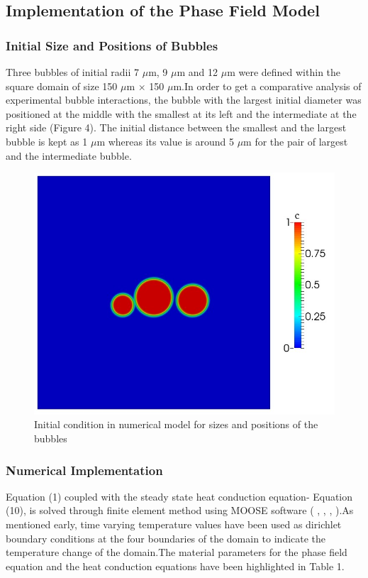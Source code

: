 \documentclass[10pt,a4paper]{article}
\begin{document}
\subsection{Implementation of the Phase Field Model}
\subsubsection{Initial Size and Positions of Bubbles}
Three bubbles of initial radii 7 $\mu$m, 9 $\mu$m and 12 $\mu$m were defined within the square domain of size 150 $\mu$m $\times$ 150 $\mu$m.In order to get a comparative analysis of experimental bubble interactions, the bubble with the largest initial diameter was positioned at the middle with the smallest at its left and the intermediate at the right side (Figure 4). The initial distance between the smallest and the largest bubble is kept as 1 $\mu$m whereas its value is around 5 $\mu$m for the pair of largest and the intermediate bubble.
\begin{figure}
\caption{Initial condition in numerical model for sizes and positions of the bubbles}
\centering
  \includegraphics[scale=0.3]{Figure4}
\end{figure}
\subsubsection{Numerical Implementation}
Equation (1) coupled with the steady state heat conduction equation- Equation (10), is solved through finite element method using MOOSE software ( \cite{14}, \cite{15}, \cite{16}, \citep{17}).As mentioned early, time varying temperature values have been used as dirichlet boundary conditions at the four boundaries of the domain to indicate the temperature change of the domain.The material parameters for the phase field equation and the heat conduction equations have been highlighted in Table 1.
\end{document}
